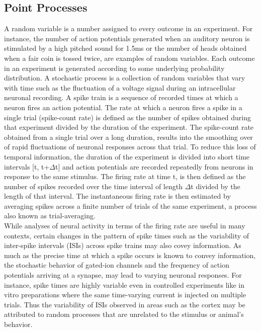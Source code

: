 \subsection{Point Processes}
A random variable is a number assigned to every outcome in an experiment.
For instance, the number of action potentials generated when an auditory neuron is stimulated
by a high pitched sound for 1.5ms or the number of heads obtained when a fair coin is tossed twice, are examples of random variables.  Each outcome in an experiment is generated according to some underlying probability distribution. A stochastic process is a collection  of random variables that vary with time such as the fluctuation of a voltage signal during an intracellular neuronal recording. A spike train is a sequence of recorded times at which a neuron fires an action potential. The rate at which a neuron fires a spike in a single trial (spike-count rate) is defined as the number of spikes obtained during that experiment divided by the duration of the experiment. The spike-count rate obtained from a single trial over a long duration, results into the smoothing over of rapid fluctuations of neuronal responses across that trial. To reduce this loss of temporal information, the duration of the experiment is divided into short time intervals [t, t+$\Delta$t] and action potentials are recorded repeatedly from neurons in response to the same stimulus.  The firing rate at time t, is then defined as the number of spikes recorded over the time interval of length $\Delta$t divided by the length of that interval. The instantaneous firing rate is then estimated by averaging spikes across a finite number of trials of the same experiment, a process also known as trial-averaging.\\

While analyses of neural activity in terms of the firing rate are useful in many contexts, certain changes in the pattern of spike times such as the variability of inter-spike intervals (ISIs) across spike trains may also covey information.
As much as the precise time at which a spike occurs is known to convey information, the stochastic behavior of gated-ion channels and the frequency of action potentials arriving at a synapse, may lead to varying neuronal responses.
For instance, spike times are highly variable even in controlled experiments like in vitro preparations where the same time-varying current is injected on multiple trials.
Thus the variability of ISIs observed in areas such as the cortex may be attributed to random processes that are unrelated to the stimulus or animal's behavior.\\


